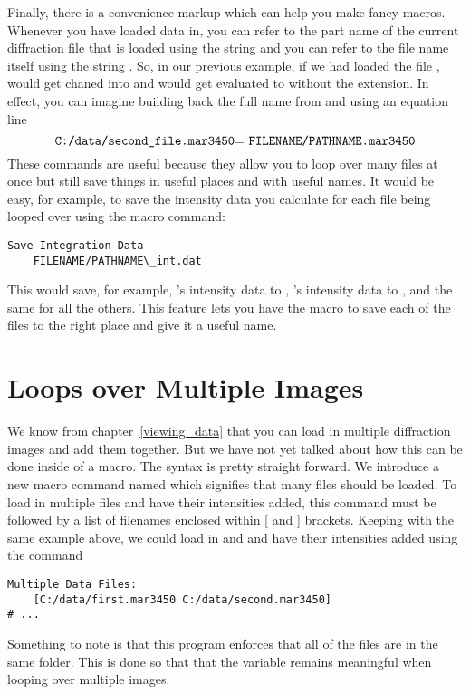 Finally, there is a convenience markup which can help
you make fancy macros. Whenever you have loaded data 
in, you can refer to the part name of the current
diffraction file that is loaded using the string
 and you can refer to the file
name itself using the string . 
So, in our previous example, if we had loaded the
file ,
 would get chaned into 
 and  would
get evaluated to  without
the extension. In effect, you can imagine building 
back the full name from  and
 using an equation line
\begin{equation*}
    \text{{\tt C:/data/second\_file.mar3450}=
    {\tt FILENAME/PATHNAME.mar3450}}
\end{equation*}
These commands are useful because they allow you to
loop over many files at once but still save things 
in useful places and with useful names. It would be
easy, for example, to save the intensity data you
calculate for each file being looped over using the 
macro command:
\begin{lstlisting}[caption={'Using the FILENAME and PATHNAME Markup'}]
Save Integration Data
    FILENAME/PATHNAME\_int.dat
\end{lstlisting}
This would save, for example, 
's intensity data to
,
's intensity data 
to , and the
same for all the others. This feature lets you have
the macro to save each of the files to the right place
and give it a useful name.

\section{Loops over Multiple Images}

We know from chapter~\ref{viewing_data} that
you can load in multiple diffraction images and add them
together. But we have not yet talked about how this can
be done inside of a macro. The syntax is pretty straight
forward. We introduce a new macro command named
 which signifies that
many files should be loaded. To load in multiple files
and have their intensities added, this command must be 
followed by a list of filenames enclosed within
[ and ] brackets. Keeping with the same example above,
we could load in  and
 and have their
intensities added using the command
\begin{lstlisting}[caption={'Add the intensities'}]
Multiple Data Files:
    [C:/data/first.mar3450 C:/data/second.mar3450]
# ...
\end{lstlisting}
Something to note is that this program enforces that
all of the files are in the same folder. This is done
so that that the  variable remains 
meaningful when looping over multiple images.

